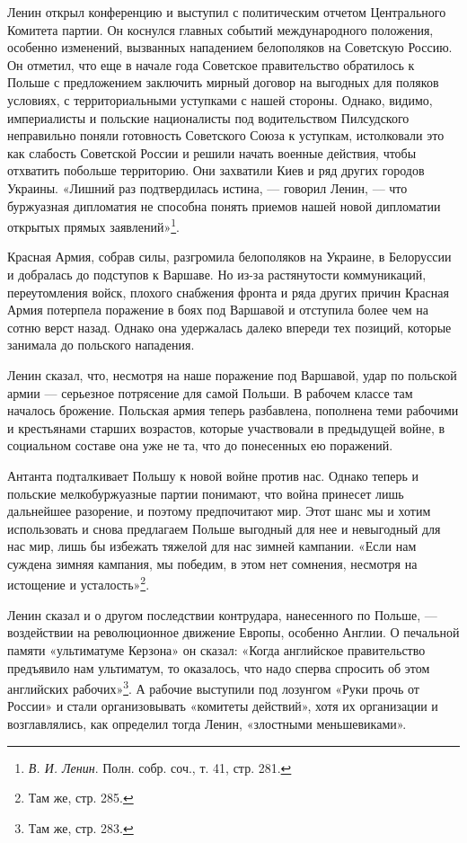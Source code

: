 \documentclass[12pt, a4paper, openany]{book}
\begin{document}
Ленин открыл конференцию и выступил с политическим отчетом Центрального Комитета партии. Он коснулся главных событий международного положения, особенно изменений, вызванных нападением белополяков на Советскую Россию. Он отметил, что еще в начале года Советское правительство обратилось к Польше с предложением заключить мирный договор на выгодных для поляков условиях, с территориальными уступками с нашей стороны. Однако, видимо, империалисты и польские националисты под водительством Пилсудского неправильно поняли готовность Советского Союза к уступкам, истолковали это как слабость Советской России и решили начать военные действия, чтобы отхватить побольше территорию. Они захватили Киев и ряд других городов Украины. «Лишний раз подтвердилась истина, — говорил Ленин, — что буржуазная дипломатия не способна понять приемов нашей новой дипломатии открытых прямых заявлений»\footnote{\textit{В. И. Ленин}. Полн. собр. соч., т. 41, стр. 281.}.

Красная Армия, собрав силы, разгромила белополяков на Украине, в Белоруссии и добралась до подступов к Варшаве. Но из-за растянутости коммуникаций, переутомления войск, плохого снабжения фронта и ряда других причин Красная Армия потерпела поражение в боях под Варшавой и отступила более чем на сотню верст назад. Однако она удержалась далеко впереди тех позиций, которые занимала до польского нападения.

Ленин сказал, что, несмотря на наше поражение под Варшавой, удар по польской армии — серьезное потрясение для самой Польши. В рабочем классе там началось брожение. Польская армия теперь разбавлена, пополнена теми рабочими и крестьянами старших возрастов, которые участвовали в предыдущей войне, в социальном составе она уже не та, что до понесенных ею поражений.

Антанта подталкивает Польшу к новой войне против нас. Однако теперь и польские мелкобуржуазные партии понимают, что война принесет лишь дальнейшее разорение, и поэтому предпочитают мир. Этот шанс мы и хотим использовать и снова предлагаем Польше выгодный для нее и невыгодный для нас мир, лишь бы избежать тяжелой для нас зимней кампании. «Если нам суждена зимняя кампания, мы победим, в этом нет сомнения, несмотря на истощение и усталость»\footnote{Там же, стр. 285.}.

Ленин сказал и о другом последствии контрудара, нанесенного по Польше, — воздействии на революционное движение Европы, особенно Англии. О печальной памяти «ультиматуме Керзона» он сказал: «Когда английское правительство предъявило нам ультиматум, то оказалось, что надо сперва спросить об этом английских рабочих»\footnote{Там же, стр. 283.}. А рабочие выступили под лозунгом «Руки прочь от России» и стали организовывать «комитеты действий», хотя их организации и возглавлялись, как определил тогда Ленин, «злостными меньшевиками».
\end{document}
